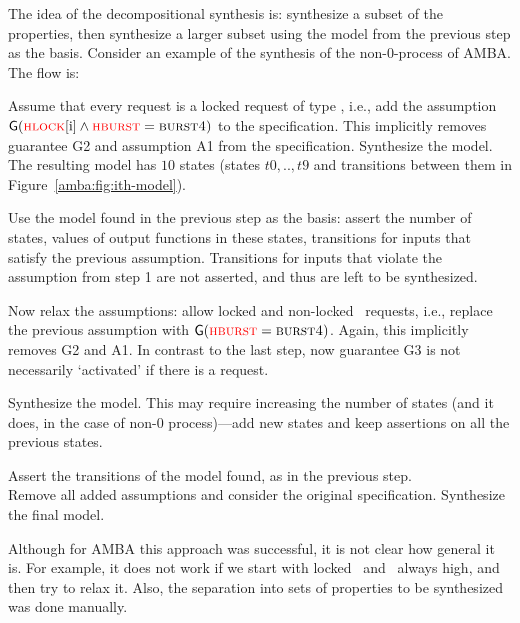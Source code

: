   The idea of the decompositional synthesis is:
  synthesize a subset of the properties,
  then synthesize a larger subset using the model from the previous step as the basis.
  Consider an example of the synthesis of the non-0-process of AMBA.
  The flow is: 
  \begin{enumerate}
  \- Assume that every request is a locked request of type \hburstfour, i.e., 
     add the assumption $\operatorname{\mathsf{G}}(\textsc{\textcolor{red}{hlock}}[\textrm{i}]\land\textsc{\textcolor{red}{hburst}}=\textsc{burst4})$ to the specification.
     This implicitly removes guarantee G2 and assumption A1 from the specification.
     Synthesize the model. The resulting model has $10$ states (states $t0,..,t9$ and transitions between them in Figure~\ref{amba:fig:ith-model}).

  \- Use the model found in the previous step as the basis:
     assert the number of states, values of output functions in these states, transitions for inputs that satisfy the previous assumption.
     Transitions for inputs that violate the assumption from step 1 are not asserted, and thus are left to be synthesized.

     Now relax the assumptions: allow locked and non-locked \hburstfour\ requests, i.e., replace the previous assumption with $\operatorname{\mathsf{G}}(\textsc{\textcolor{red}{hburst}}=\textsc{burst4})$.
     Again, this implicitly removes G2 and A1.
     In contrast to the last step, now guarantee G3 is not necessarily `activated' if there is a request.

     Synthesize the model.
     This may require increasing the number of states (and it does, in the case of non-0 process)---add new states and keep assertions on all the previous states.

  \- Assert the transitions of the model found, as in the previous step.\\
     Remove all added assumptions and consider the original specification.
     Synthesize the final model.
\end{enumerate}

Although for AMBA this approach was successful, it is not clear how general it is.
For example, it does not work if we start with locked \hburstfour\ and \hready\ always high,
and then try to relax it.
Also, the separation into sets of properties to be synthesized was done manually.


